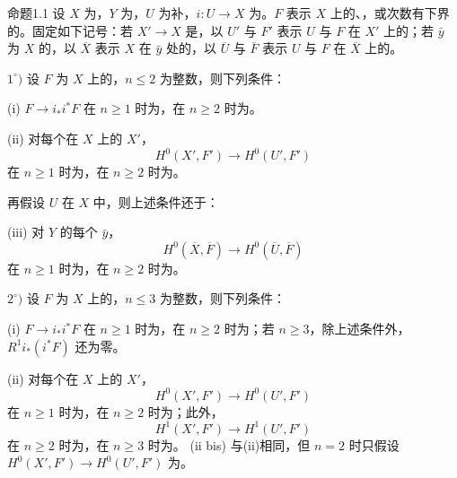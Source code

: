 \begin{SGAresult}{命题}{1.1}
设 $X$ 为，$Y$ 为，$U$ 为补，$i:U\to X$ 为。$F$ 表示 $X$ 上的、，或次数有下界的。固定如下记号：若 $X'\to X$ 是，以 $U'$ 与 $F'$ 表示 $U$ 与 $F$ 在 $X'$ 上的；若 $\bar y$ 为 $X$ 的，以 $\overline X$ 表示 $X$ 在 $\bar y$ 处的，以 $\overline U$ 与 $\overline F$ 表示 $U$ 与 $F$ 在 $\overline X$ 上的。

$1^\circ)$ 设 $F$ 为 $X$ 上的，$n\leq2$ 为整数，则下列条件：

(i)  $F\to i_*i^*F$ 在 $n\geq1$ 时为，在 $n\geq2$ 时为。

(ii) 对每个在 $X$ 上的 $X'$，
\[H^0(X',F')\longrightarrow H^0(U',F')\]
在 $n\geq1$ 时为，在 $n\geq2$ 时为。

再假设 $U$ 在 $X$ 中，则上述条件还于：

(iii) 对 $Y$ 的每个 $\bar y$，
\[H^0(\overline X,\overline F)\longrightarrow H^0(\overline U,\overline F)\]
在 $n\geq1$ 时为，在 $n\geq2$ 时为。

$2^\circ)$ 设 $F$ 为 $X$ 上的，$n\leq3$ 为整数，则下列条件：

(i)  $F\to i_*i^*F$ 在 $n\geq1$ 时为，在 $n\geq2$ 时为；若 $n\geq3$，除上述条件外， $R^1i_*(i^*F)$ 还为零。

(ii) 对每个在 $X$ 上的 $X'$，
\[H^0(X',F')\longrightarrow H^0(U',F')\]
在 $n\geq1$ 时为，在 $n\geq2$ 时为；此外，
\[H^1(X',F')\longrightarrow H^1(U',F')\]
在 $n\geq2$ 时为，在 $n\geq3$ 时为。
(ii bis) 与(ii)相同，但 $n=2$ 时只假设 $H^0(X',F')\to H^0(U',F')$ 为。


\end{SGAresult}

